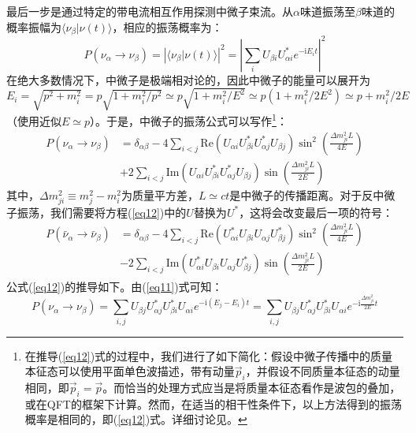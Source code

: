 \documentclass{article}
\newcommand{\ii}{\mathrm{i}}
\begin{document}
	最后一步是通过特定的带电流相互作用探测中微子束流。从$\alpha$味道振荡至$\beta$味道的概率振幅为$\langle\nu_\beta|\nu(t)\rangle$，相应的振荡概率为：
	\begin{equation}
		P(\nu_\alpha\to\nu_\beta)=\left|\langle\nu_\beta|\nu(t)\rangle\right|^2=\left|\sum_i U_{\beta i}U_{\alpha i}^* e^{-\ii E_it}\right|^2
		\label{eq11}
	\end{equation}
	在绝大多数情况下，中微子是极端相对论的，因此中微子的能量可以展开为$E_i=\sqrt{p^2+m_i^2}=p\sqrt{1+m_i^2/p^2}\simeq p\sqrt{1+m_i^2/E^2}\simeq p(1+m_i^2/2E^2)\simeq p+m_i^2/2E$（使用近似$E\simeq p$）。于是，中微子的振荡公式可以写作\footnote{在推导(\ref{eq12})式的过程中，我们进行了如下简化：假设中微子传播中的质量本征态可以使用平面单色波描述，带有动量$\vec{p}_i$，并假设不同质量本征态的动量相同，即$\vec{p}_i=\vec{p}$。而恰当的处理方式应当是将质量本征态看作是波包的叠加，或在QFT的框架下计算。然而，在适当的相干性条件下，以上方法得到的振荡概率是相同的，即(\ref{eq12})式。详细讨论见\cite{akhmedov2009paradoxes}。}：
	\begin{equation}
		\begin{aligned}
			P(\nu_\alpha\to\nu_\beta)&=\delta_{\alpha\beta}-4\sum_{i<j}\mathrm{Re}(U_{\alpha i}U_{\beta i}^\ast U_{\alpha j}^\ast U_{\beta j})\sin^2\left(\frac{\Delta m_{ji}^2L}{4E}\right)\\&+2\sum_{i<j}\mathrm{Im}(U_{\alpha i}U_{\beta i}^\ast U_{\alpha j}^\ast U_{\beta j})\sin\left(\frac{\Delta m_{ji}^2L}{2E}\right)
		\end{aligned}
		\label{eq12}
	\end{equation}
	其中，$\Delta m_{ji}^2\equiv m_j^2-m_i^2$为质量平方差，$L\simeq ct$是中微子的传播距离。对于反中微子振荡，我们需要将方程(\ref{eq12})中的$U$替换为$U^*$，这将会改变最后一项的符号：
	\begin{equation*}
		\begin{aligned}
			P(\bar{\nu}_\alpha\to\bar{\nu}_\beta)&=\delta_{\alpha\beta}-4\sum_{i<j}\mathrm{Re}(U_{\alpha i}^*U_{\beta i} U_{\alpha j} U_{\beta j}^*)\sin^2\left(\frac{\Delta m_{ji}^2L}{4E}\right)\\&-2\sum_{i<j}\mathrm{Im}(U_{\alpha i}^*U_{\beta i} U_{\alpha j} U_{\beta j}^*)\sin\left(\frac{\Delta m_{ji}^2L}{2E}\right)
		\end{aligned}
	\end{equation*}
	公式(\ref{eq12})的推导如下。由(\ref{eq11})式可知：
	\begin{equation*}
		P(\nu_\alpha\to\nu_\beta)=\sum_{i,j}U_{\beta j}U_{\alpha j}^*U_{\beta i}^* U_{\alpha i}e^{-\ii (E_j-E_i)t}=\sum_{i,j}U_{\beta j}U_{\alpha j}^*U_{\beta i}^* U_{\alpha i}e^{-\ii \frac{\Delta m_{ji}^2}{2E} t}
	\end{equation*}
\end{document}
